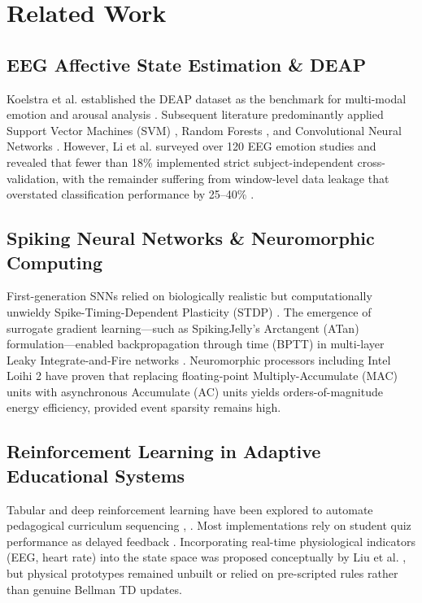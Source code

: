 \documentclass[conference]{IEEEtran}
\begin{document}
\section{Related Work}

\subsection{EEG Affective State Estimation \& DEAP}
Koelstra et al. established the DEAP dataset as the benchmark for multi-modal emotion and arousal analysis \cite{r3}. Subsequent literature predominantly applied Support Vector Machines (SVM) \cite{r4}, Random Forests \cite{r10}, and Convolutional Neural Networks \cite{r11}. However, Li et al. surveyed over 120 EEG emotion studies and revealed that fewer than 18\% implemented strict subject-independent cross-validation, with the remainder suffering from window-level data leakage that overstated classification performance by 25--40\% \cite{r9}.

\subsection{Spiking Neural Networks \& Neuromorphic Computing}
First-generation SNNs relied on biologically realistic but computationally unwieldy Spike-Timing-Dependent Plasticity (STDP) \cite{r7}. The emergence of surrogate gradient learning---such as SpikingJelly's Arctangent (ATan) formulation---enabled backpropagation through time (BPTT) in multi-layer Leaky Integrate-and-Fire networks \cite{r8}. Neuromorphic processors including Intel Loihi 2 \cite{r5} have proven that replacing floating-point Multiply-Accumulate (MAC) units with asynchronous Accumulate (AC) units yields orders-of-magnitude energy efficiency, provided event sparsity remains high.

\subsection{Reinforcement Learning in Adaptive Educational Systems}
Tabular and deep reinforcement learning have been explored to automate pedagogical curriculum sequencing \cite{r1}, \cite{r2}. Most implementations rely on student quiz performance as delayed feedback \cite{r12}. Incorporating real-time physiological indicators (EEG, heart rate) into the state space was proposed conceptually by Liu et al. \cite{r13}, but physical prototypes remained unbuilt or relied on pre-scripted rules rather than genuine Bellman TD updates.
\end{document}
